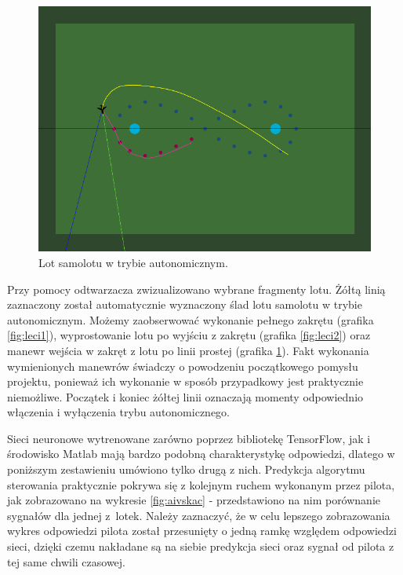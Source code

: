 \documentclass[12pt, a4paper]{article}
\begin{document}
 \begin{figure}[H]
    \centering
    \includegraphics[width=1\textwidth]{aileci3}
    \caption{Lot samolotu w trybie autonomicznym.}
    \label{fig:leci3}
\end{figure}

Przy pomocy odtwarzacza zwizualizowano wybrane fragmenty lotu. Żółtą linią zaznaczony został automatycznie wyznaczony ślad lotu samolotu w trybie autonomicznym. Możemy zaobserwować wykonanie pełnego zakrętu (grafika \ref{fig:leci1}), wyprostowanie lotu po wyjściu z zakrętu (grafika \ref{fig:leci2}) oraz manewr wejścia w zakręt z lotu po linii prostej (grafika \ref{fig:leci3}). Fakt wykonania wymienionych manewrów świadczy o powodzeniu początkowego pomysłu projektu, ponieważ ich wykonanie w sposób przypadkowy jest praktycznie niemożliwe. Początek i koniec żółtej linii oznaczają momenty odpowiednio włączenia i wyłączenia trybu autonomicznego. 

Sieci neuronowe wytrenowane zarówno poprzez bibliotekę TensorFlow, jak i środowisko Matlab mają bardzo podobną charakterystykę odpowiedzi, dlatego w poniższym zestawieniu umówiono tylko drugą z nich. Predykcja algorytmu sterowania praktycznie pokrywa się z kolejnym ruchem wykonanym przez pilota, jak zobrazowano na wykresie \ref{fig:aivskac} - przedstawiono na nim porównanie sygnałów dla jednej z~lotek. Należy zaznaczyć, że w celu lepszego zobrazowania wykres odpowiedzi pilota został przesunięty o jedną ramkę względem odpowiedzi sieci, dzięki czemu nakładane są na siebie predykcja sieci oraz sygnał od pilota z tej same chwili czasowej.
\end{document}
